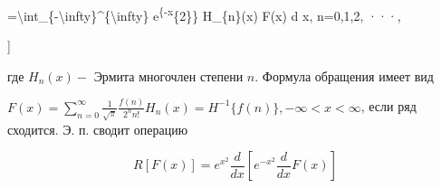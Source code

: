 \documentclass[10pt]{article}
\begin{document}
=\textbackslash int\_\{-\textbackslash infty\}\^{}\{\textbackslash infty\} e\textsuperscript{\{-x}\{2\}\} H\_\{n\}(x) F(x) d x, n=0,1,2, ···,

]



где $H_{n}(x)-$ Эрмита многочлен степени $n$. Формула обращения имеет вид



$F(x)=\sum_{n=0}^{\infty} \frac{1}{\sqrt{\pi}} \frac{f(n)}{2^{n} n !} H_{n}(x)=H^{-1}\{f(n)\},-\infty<x<\infty$, если ряд сходится. Э. п. сводит операцию



\[

R[F(x)]=e^{x^{2}} \frac{d}{d x}\left[e^{-x^{2}} \frac{d}{d x} F(x)\right]

\]
\end{document}

